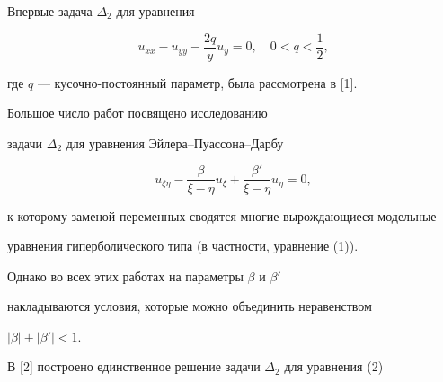  


\date{} 




\pagestyle{plain} %


 




\maketitle 


\label{begin} 


 


 


 


Впервые задача $\Delta_2$ для уравнения 


\begin{equation} 


u_{xx}-u_{yy}-\frac{2q}{y}u_y=0,\quad 0<q<\frac{1}{2}, 


\end{equation} 


где $q$ --- кусочно-постоянный параметр, была рассмотрена в [1]. 


Большое число работ посвящено исследованию 


задачи $\Delta_2$ для уравнения Эйлера--Пуассона--Дарбу 


\begin{equation} 


u_{\xi\eta}-\frac{\beta}{\xi-\eta}u_\xi+ 


\frac{\beta'}{\xi-\eta}u_\eta=0, 


\end{equation} 


к которому заменой переменных сводятся многие вырождающиеся модельные 


уравнения гиперболического типа (в частности, уравнение (1)). 


Однако во всех этих работах на параметры $\beta$ и $\beta'$ 


накладываются условия, которые можно объединить неравенством 


$|\beta|+|\beta'|<1$. 


 


В [2] построено единственное решение задачи $\Delta_2$ для уравнения (2) 


